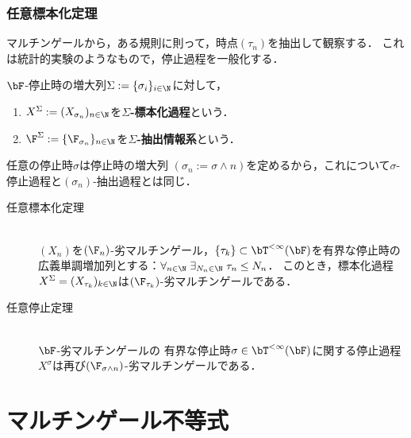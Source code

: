\documentclass[uplatex,dvipdfmx]{jsreport}
\begin{document}
\subsubsection{任意標本化定理}

\begin{tcolorbox}[colframe=ForestGreen, colback=ForestGreen!10!white,breakable,colbacktitle=ForestGreen!40!white,coltitle=black,fonttitle=\bfseries\sffamily,
title=]
    マルチンゲールから，ある規則に則って，時点$(\tau_n)$を抽出して観察する．
    これは統計的実験のようなもので，停止過程を一般化する．
\end{tcolorbox}

\begin{definition}
    $\bF$-停止時の増大列$\Sigma:=\{\sigma_i\}_{i\in\N}$に対して，
    \begin{enumerate}
        \item $X^\Sigma:=(X_{\sigma_n})_{n\in\N}$を\textbf{$\Sigma$-標本化過程}という．
        \item $\F^\Sigma:=\{\F_{\sigma_n}\}_{n\in\N}$を\textbf{$\Sigma$-抽出情報系}という．
    \end{enumerate}
\end{definition}
\begin{example}[停止過程は抽出過程である]
    任意の停止時$\sigma$は停止時の増大列
    $(\sigma_n:=\sigma\land n)$を定めるから，これについて$\sigma$-停止過程と$(\sigma_n)$-抽出過程とは同じ．
\end{example}

\begin{corollary}\mbox{}
    \begin{description}
        \item[任意標本化定理] \mbox{}\\$(X_n)$を$(\F_n)$-劣マルチンゲール，$\{\tau_k\}\subset\bT^{<\infty}(\bF)$を有界な停止時の広義単調増加列とする：$\forall_{n\in\N}\;\exists_{N_n\in\N}\;\tau_n\le N_n$．
        このとき，標本化過程$X^\Sigma=(X_{\tau_k})_{k\in\N}$は$(\F_{\tau_k})$-劣マルチンゲールである．
        \item[任意停止定理] \mbox{}\\
        $\bF$-劣マルチンゲールの
        有界な停止時$\sigma\in\bT^{<\infty}(\bF)$に関する停止過程$X^\sigma$は再び$(\F_{\sigma\land n})$-劣マルチンゲールである．
    \end{description}
\end{corollary}

\section{マルチンゲール不等式}
\end{document}
